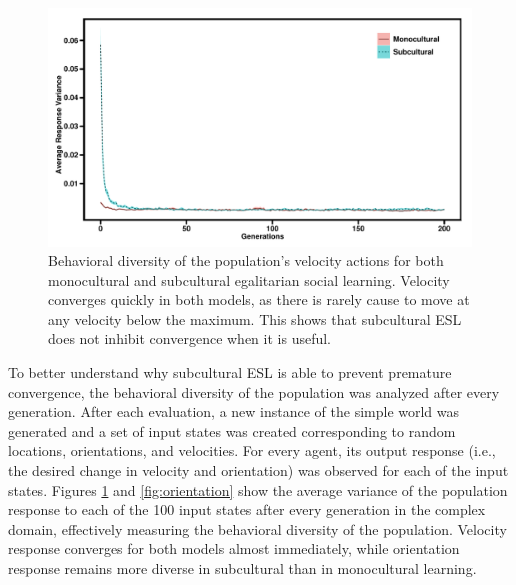 \documentclass{sig-alternate}
\begin{document}
\begin{figure}
  \centering
    \includegraphics[scale=.42]{velocity_diversity.pdf}
  \caption{Behavioral diversity of the population's velocity actions for both monocultural and subcultural egalitarian social learning.   Velocity converges quickly in both models, as there is rarely cause to move at any velocity below the maximum.  This shows that subcultural ESL does not inhibit convergence when it is useful.}
  \label{fig:velocity}
\end{figure}

To better understand why subcultural ESL is able to prevent premature convergence, the behavioral diversity of the population was analyzed after every generation. After each evaluation, a new instance of the simple world was generated and a set of input states was created corresponding to random locations, orientations, and velocities. For every agent, its output response (i.e., the desired change in velocity and orientation) was observed for each of the input states. Figures \ref{fig:velocity} and \ref{fig:orientation} show the average variance of the population response to each of the 100 input states after every generation in the complex domain, effectively measuring the behavioral diversity of the population.  Velocity response converges for both models almost immediately, while orientation response remains more diverse in subcultural than in monocultural learning.
\end{document}
